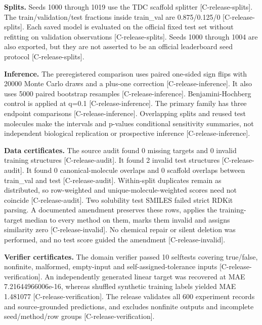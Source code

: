 \documentclass[10pt,twocolumn]{article}
\begin{document}
\textbf{Splits.} Seeds 1000 through 1019 use the TDC scaffold splitter {\scriptsize[C-release-splits]}. The train/validation/test fractions inside train_val are 0.875/0.125/0 {\scriptsize[C-release-splits]}. Each saved model is evaluated on the official fixed test set without refitting on validation observations {\scriptsize[C-release-splits]}. Seeds 1000 through 1004 are also exported, but they are not asserted to be an official leaderboard seed protocol {\scriptsize[C-release-splits]}.

\textbf{Inference.} The preregistered comparison uses paired one-sided sign flips with 20000 Monte Carlo draws and a plus-one correction {\scriptsize[C-release-inference]}. It also uses 5000 paired bootstrap resamples {\scriptsize[C-release-inference]}. Benjamini-Hochberg control is applied at q=0.1 {\scriptsize[C-release-inference]}. The primary family has three endpoint comparisons {\scriptsize[C-release-inference]}. Overlapping splits and reused test molecules make the intervals and p-values conditional sensitivity summaries, not independent biological replication or prospective inference {\scriptsize[C-release-inference]}.

\textbf{Data certificates.} The source audit found 0 missing targets and 0 invalid training structures {\scriptsize[C-release-audit]}. It found 2 invalid test structures {\scriptsize[C-release-audit]}. It found 0 canonical-molecule overlaps and 0 scaffold overlaps between train_val and test {\scriptsize[C-release-audit]}. Within-split duplicates remain as distributed, so row-weighted and unique-molecule-weighted scores need not coincide {\scriptsize[C-release-audit]}. Two solubility test SMILES failed strict RDKit parsing. A documented amendment preserves these rows, applies the training-target median to every method on them, marks them invalid and assigns similarity zero {\scriptsize[C-release-invalid]}. No chemical repair or silent deletion was performed, and no test score guided the amendment {\scriptsize[C-release-invalid]}.

\textbf{Verifier certificates.} The domain verifier passed 10 selftests covering true/false, nonfinite, malformed, empty-input and self-assigned-tolerance inputs {\scriptsize[C-release-verification]}. An independently generated linear target was recovered at MAE 7.21644966006e-16, whereas shuffled synthetic training labels yielded MAE 1.481077 {\scriptsize[C-release-verification]}. The release validates all 600 experiment records and source-grounded predictions, and excludes nonfinite outputs and incomplete seed/method/row groups {\scriptsize[C-release-verification]}.
\end{document}
